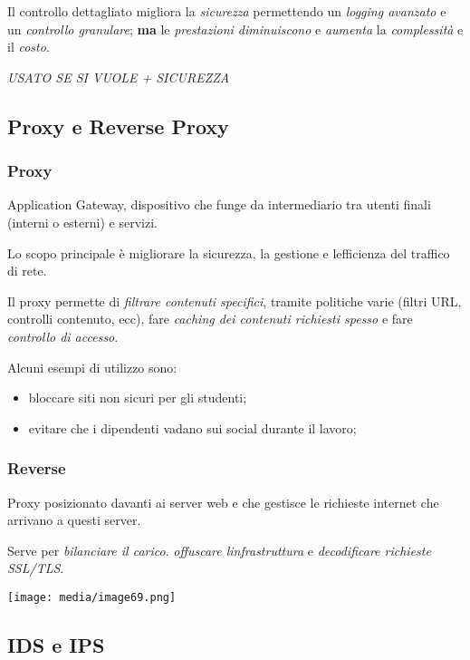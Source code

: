 Il controllo dettagliato migliora la \emph{sicurezza} permettendo un
\emph{logging avanzato} e un \emph{controllo granulare}; \textbf{ma} le
\emph{prestazioni diminuiscono} e \emph{aumenta} la \emph{complessità} e
il \emph{costo}.

\emph{USATO SE SI VUOLE + SICUREZZA}

\subsection{Proxy e Reverse Proxy}\label{proxy-e-reverse-proxy}

\subsubsection{Proxy}\label{proxy}

Application Gateway, dispositivo che funge da intermediario tra utenti
finali (interni o esterni) e servizi.

Lo scopo principale è migliorare la sicurezza, la gestione e
l\textquotesingle efficienza del traffico di rete.

Il proxy permette di \emph{filtrare contenuti specifici}, tramite
politiche varie (filtri URL, controlli contenuto, ecc), fare
\emph{caching dei contenuti richiesti spesso} e fare \emph{controllo di
accesso}.

Alcuni esempi di utilizzo sono:

\begin{itemize}
\item
  bloccare siti non sicuri per gli studenti;
\item
  evitare che i dipendenti vadano sui social durante il lavoro;
\end{itemize}

\subsubsection{Reverse}\label{reverse}

Proxy posizionato davanti ai server web e che gestisce le richieste
internet che arrivano a questi server.

Serve per \emph{bilanciare il carico}. \emph{offuscare
l\textquotesingle infrastruttura} e \emph{decodificare richieste
SSL/TLS}.

\texttt{[image: media/image69.png]}

\subsection{IDS e IPS}\label{ids-e-ips}

